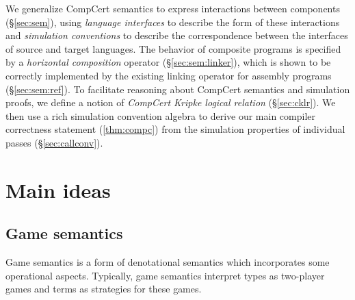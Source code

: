 \documentclass[sigplan,screen]{acmart}
\begin{document}
We generalize CompCert semantics
to express interactions between components (\S\ref{sec:sem}),
using \emph{language interfaces}
to describe the form of these interactions
and \emph{simulation conventions}
to describe the correspondence between the interfaces
of source and target languages.
The behavior of
composite programs is specified by a
\emph{horizontal composition} operator (\S\ref{sec:sem:linker}),
which is shown to be correctly implemented
by the existing linking operator for assembly programs
(\S\ref{sec:sem:ref}).
To facilitate reasoning about CompCert semantics and simulation proofs,
we define a notion of
\emph{CompCert Kripke logical relation} (\S\ref{sec:cklr}).
We then use a rich simulation convention algebra
to derive our main compiler correctness statement (\autoref{thm:compc})
from the simulation properties
of individual passes
(\S\ref{sec:callconv}).





\section{Main ideas} \label{sec:mainideas} %

\subsection{Game semantics} \label{sec:gamesem} %


Game semantics is a form of denotational semantics which
incorporates some operational aspects.
Typically,
game semantics interpret
types as two-player games
and terms as strategies for these games.
\end{document}
